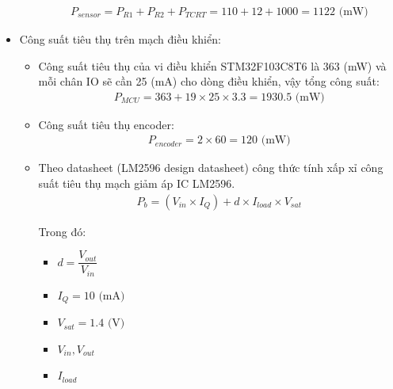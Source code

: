 \begin{itemize}
\begin{itemize}
\begin{align}
                            P_{sensor} = P_{R1} + P_{R2} + P_{TCRT} = 110 + 12 + 1000 = 1122 \text{ (mW)}
                        \end{align}
                    \end{itemize}
                    \item Công suất tiêu thụ trên mạch điều khiển:
                    \begin{itemize}
                        \item Công suất tiêu thụ của vi điều khiển STM32F103C8T6 là 363 (mW) và mỗi chân IO sẽ cần 25 (mA) cho dòng điều khiển, vậy tổng công suất:
                        \begin{align}
                            P_{MCU} = 363 + 19 \times 25 \times 3.3 = 1930.5 \text{ (mW)}
                        \end{align}
                        \item Công suất tiêu thụ encoder:
                        \begin{align}
                            P_{encoder} = 2 \times 60 = 120 \text{ (mW)}
                        \end{align}
                        \item Theo datasheet (LM2596 design datasheet) công thức tính xấp xỉ công suất tiêu thụ mạch giảm áp IC LM2596.
                        \begin{align}
                            P_b = (V_{in} \times I_Q) + d \times I_{load} \times V_{sat}
                        \end{align}

                        Trong đó:
                        \begin{itemize}
                            \item $d = \dfrac{V_{out}}{V_{in}}$  \\
                            \item $I_Q = 10 \text{ (mA)}$  \\
                            \item $V_{sat} = 1.4 \text{ (V)}$  \\
                            \item $V_{in}, V_{out}$  \\
                            \item $I_{load}$ 
                        \end{itemize}


\end{itemize}
\end{itemize}

